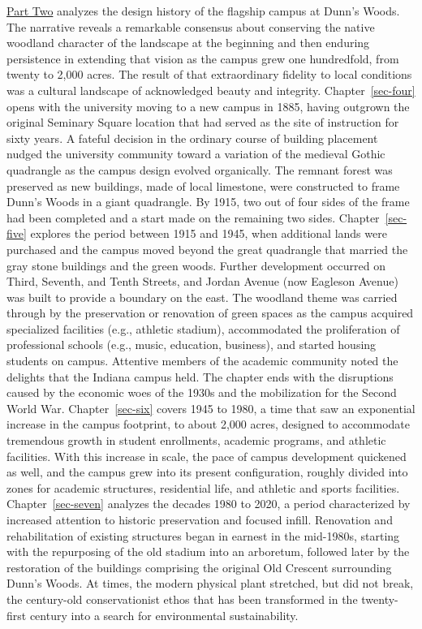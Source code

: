 \documentclass[
  american,
  letterpaper,
]{scrreprt}
\begin{document}
\hyperref[sec-parttwo]{Part Two} analyzes the design history of the
flagship campus at Dunn's Woods. The narrative reveals a remarkable
consensus about conserving the native woodland character of the
landscape at the beginning and then enduring persistence in extending
that vision as the campus grew one hundredfold, from twenty to 2,000
acres. The result of that extraordinary fidelity to local conditions was
a cultural landscape of acknowledged beauty and integrity.
Chapter~\ref{sec-four} opens with the university moving to a new campus
in 1885, having outgrown the original Seminary Square location that had
served as the site of instruction for sixty years. A fateful decision in
the ordinary course of building placement nudged the university
community toward a variation of the medieval Gothic quadrangle as the
campus design evolved organically. The remnant forest was preserved as
new buildings, made of local limestone, were constructed to frame Dunn's
Woods in a giant quadrangle. By 1915, two out of four sides of the frame
had been completed and a start made on the remaining two sides.
Chapter~\ref{sec-five} explores the period between 1915 and 1945, when
additional lands were purchased and the campus moved beyond the great
quadrangle that married the gray stone buildings and the green woods.
Further development occurred on Third, Seventh, and Tenth Streets, and
Jordan Avenue (now Eagleson Avenue) was built to provide a boundary on
the east. The woodland theme was carried through by the preservation or
renovation of green spaces as the campus acquired specialized facilities
(e.g., athletic stadium), accommodated the proliferation of professional
schools (e.g., music, education, business), and started housing students
on campus. Attentive members of the academic community noted the
delights that the Indiana campus held. The chapter ends with the
disruptions caused by the economic woes of the 1930s and the
mobilization for the Second World War. Chapter~\ref{sec-six} covers 1945
to 1980, a time that saw an exponential increase in the campus
footprint, to about 2,000 acres, designed to accommodate tremendous
growth in student enrollments, academic programs, and athletic
facilities. With this increase in scale, the pace of campus development
quickened as well, and the campus grew into its present configuration,
roughly divided into zones for academic structures, residential life,
and athletic and sports facilities. Chapter~\ref{sec-seven} analyzes the
decades 1980 to 2020, a period characterized by increased attention to
historic preservation and focused infill. Renovation and rehabilitation
of existing structures began in earnest in the mid-1980s, starting with
the repurposing of the old stadium into an arboretum, followed later by
the restoration of the buildings comprising the original Old Crescent
surrounding Dunn's Woods. At times, the modern physical plant stretched,
but did not break, the century-old conservationist ethos that has been
transformed in the twenty-first century into a search for environmental
sustainability.
\end{document}
